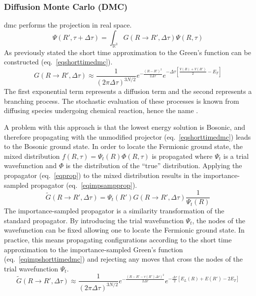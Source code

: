 \subsubsection{Diffusion Monte Carlo (DMC)}
\gls{dmc} performs the projection in real space.\cite{10.1016/bs.aiq.2015.07.003,10.1103/RevModPhys.73.33}
\begin{equation}
    \Psi(R',\tau + \Delta\tau) = \int_{\mathbb{R}^3} G(R \rightarrow R',\Delta \tau) \Psi(R,\tau)
\end{equation}
As previously stated the short time approximation to the Green's function can be constructed (eq.~\ref{eqshorttimedmc}).
\begin{equation}
    G(R \rightarrow R', \Delta \tau) \approx \frac{1}{(2\pi\Delta\tau)^{3N/2}} e^{-\frac{(R - R')^2 }{2\Delta\tau}} e^{-\Delta\tau[\frac{V(R) + V(R')}{2} - E_T]}
\label{eqshorttimedmc}
\end{equation}
The first exponential term represents a diffusion term and the second represents a branching process.
The stochastic evaluation of these processes is known from diffusing species undergoing chemical reaction, hence the name .

A problem with this approach is that the lowest energy solution is Bosonic, and therefore propagating with the unmodified projector (eq.~\ref{eqshorttimedmc}) leads to the Bosonic ground state.
In order to locate the Fermionic ground state, the mixed distribution $f(R,\tau) = \Psi_t(R)\Phi(R,\tau)$ is propagated where $\Psi_t$ is a trial wavefunction and $\Phi$ is the distribution of the ``true'' distribution.
Applying the propagator (eq.~\ref{eqprop}) to the mixed distribution results in the importance-sampled propagator (eq.~\ref{eqimpsampprop}). 
\begin{equation}
    \tilde{G}(R \rightarrow R', \Delta \tau)  = \Psi_t(R') G(R \rightarrow R', \Delta \tau) \frac{1}{\Psi_t(R)}
\label{eqimpsampprop}
\end{equation}
The importance-sampled propagator is a similarity transformation of the standard propagator.
By introducing the trial wavefunction $\Psi_t$, the nodes of the wavefunction can be fixed allowing one to locate the Fermionic ground state.
In practice, this means propagating configurations according to the short time approximation to the importance-sampled Green's function (eq.~\ref{eqimpshorttimedmc}) and rejecting any moves that cross the nodes of the trial wavefunction $\Psi_t$.
\begin{equation}
    \tilde{G}(R \rightarrow R', \Delta \tau) \approx \frac{1}{(2\pi\Delta\tau)^{3N/2}} e^{-\frac{(R - R' - v(R') \Delta \tau)^2 }{2\Delta\tau}} e^{-\frac{\Delta\tau}{2}[E_L(R) + E(R') - 2E_T]}
\label{eqimpshorttimedmc}
\end{equation}


